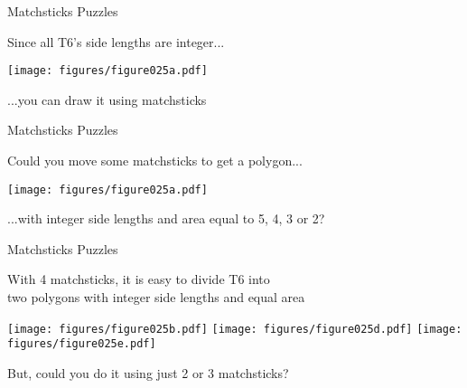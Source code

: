 \documentclass[14pt]{beamer}
\begin{document}

    \begin{frame}{Matchsticks Puzzles}
        \begin{center}
            Since all T6's side lengths are integer...

            \bigskip

            \texttt{[image: figures/figure025a.pdf]}

            \bigskip

            {...you can draw it using matchsticks}

            \bigskip\bigskip
        \end{center}
    \end{frame}


    \begin{frame}{Matchsticks Puzzles}
        \begin{center}
            Could you move some matchsticks to get a polygon...

            \bigskip

            \texttt{[image: figures/figure025a.pdf]}

            \bigskip

            {...with integer side lengths and area equal to 5, 4, 3 or 2?}

            \bigskip\bigskip
        \end{center}
    \end{frame}


    \begin{frame}{Matchsticks Puzzles}
        \begin{center}
            {With 4 matchsticks, it is easy to divide T6 into\\[1ex]two polygons with integer side lengths and equal area}

            \bigskip\bigskip

            \texttt{[image: figures/figure025b.pdf]}\quad
            \texttt{[image: figures/figure025d.pdf]}\quad
            \texttt{[image: figures/figure025e.pdf]}\\

            \bigskip\bigskip

            {But, could you do it using just 2 or 3 matchsticks?}

            \bigskip\bigskip
        \end{center}
    \end{frame}
\end{document}
